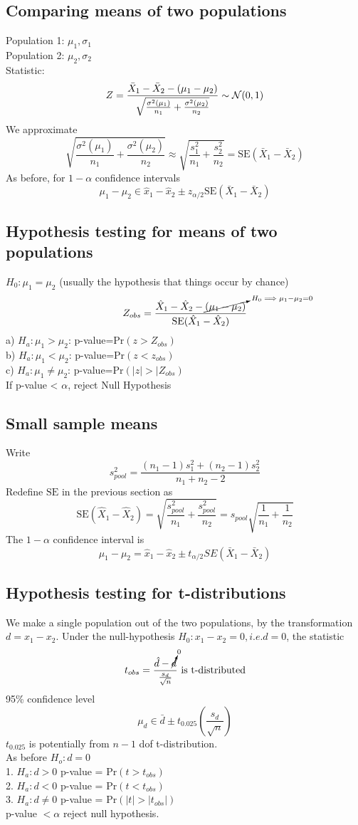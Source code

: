\documentclass{article}
\newcommand{\beq}{\begin{equation}}
\newcommand{\eeq}{\end{equation}}
\begin{document}
\subsection{Comparing means of two populations}
Population 1: $\mu_1,\sigma_1$\\
Population 2: $\mu_2,\sigma_2$\\
Statistic:
\beq
Z = \frac{\bar{X}_1-\bar{X}_2 - (\mu_1-\mu_2)}{\sqrt{\frac{\sigma^2(\mu_1)}{n_1}+\frac{\sigma^2(\mu_2)}{n_2}}} \sim \mathcal{N}(0,1) \\
\eeq
We approximate
\beq
\sqrt{\frac{\sigma^2(\mu_1)}{n_1}+\frac{\sigma^2(\mu_2)}{n_2}} \approx \sqrt{\frac{s_1^2}{n_1}+\frac{s_2^2}{n_2}} = \text{SE}(\bar{X}_1-\bar{X}_2)
\eeq
As before, for $1-\alpha$ confidence intervals
\beq
\mu_1 - \mu_2 \in \hat{x}_1 - \hat{x}_2 \pm z_{\alpha/2}\text{SE}(\bar{X}_1-\bar{X}_2)
\eeq
\subsection{Hypothesis testing for means of two populations}
$H_0:\mu_1 = \mu_2$ (usually the hypothesis that things occur by chance)
\beq
Z_{obs} = \frac{\hat{X}_1-\hat{X}_2-\cancelto{H_0 \implies \mu_1-\mu_2=0}{(\mu_1-\mu_2)}}{\text{SE}(\hat{X}_1-\hat{X}_2)}
\eeq
a) $H_a: \mu_1 > \mu_2$: p-value=Pr$(z>Z_{obs})$\\
b) $H_a: \mu_1 < \mu_2$: p-value=Pr$(z<z_{obs})$\\
c) $H_a:\mu_1\ne\mu_2$: p-value=Pr$(|z|>|Z_{obs})$\\
If p-value < $\alpha$, reject Null Hypothesis
\subsection{Small sample means}
Write
\beq
s^2_{pool} = \frac{ (n_1-1)s^2_1 + (n_2-1)s^2_2}{n_1 + n_2 - 2}
\eeq
Redefine $\text{SE}$ in the previous section as
\beq
\text{SE}(\hat{X}_1- \hat{X}_2) = \sqrt{\frac{s^2_{pool}}{n_1} + \frac{s^2_{pool}}{n_2}} = s_{pool}\sqrt{\frac{1}{n_1} + \frac{1}{n_2}}
\eeq
The $1-\alpha$ confidence interval is
\beq
\mu_1 - \mu_2 = \hat{x}_1 - \hat{x}_2 \pm t_{\alpha/2}SE(\bar{X}_1-\bar{X}_2)
\eeq
\subsection{Hypothesis testing for t-distributions}
We make a single population out of the two populations, by the transformation
$d=x_1-x_2$. Under the null-hypothesis $H_0:x_1-x_2=0, i.e. d = 0$, the statistic
\beq
t_{obs} = \frac{\hat{d}-\cancelto{0}{d}}{\frac{s_d}{\sqrt{n}}} \text{ is t-distributed}
\eeq
95\% confidence level
\beq
\mu_d \in \bar{d} \pm t_{0.025}(\frac{s_d}{\sqrt{n}})
\eeq
$t_{0.025}$ is potentially from $n-1$ dof t-distribution.\\
As before $H_o: d=0$\\
1. $H_a:d>0$ p-value = Pr$(t>t_{obs})$\\
2. $H_a:d<0$ p-value = Pr$(t<t_{obs})$\\
3. $H_a:d\ne{0}$ p-value = Pr$(|t|>|t_{obs}|)$\\
p-value $<\alpha$ reject null hypothesis.
\end{document}
